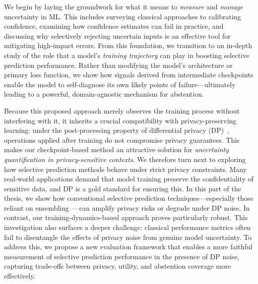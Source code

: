We begin by laying the groundwork for what it means to \emph{measure} and \emph{manage} uncertainty in ML. This includes surveying classical approaches to calibrating confidence, examining how confidence estimates can fail in practice, and discussing why selectively rejecting uncertain inputs is an effective tool for mitigating high-impact errors. From this foundation, we transition to an in-depth study of the role that a model’s \emph{training trajectory} can play in boosting selective prediction performance. Rather than modifying the model’s architecture or primary loss function, we show how signals derived from intermediate checkpoints enable the model to self-diagnose its own likely points of failure—ultimately leading to a powerful, domain-agnostic mechanism for abstention.

Because this proposed approach merely observes the training process without interfering with it, it inherits a crucial compatibility with privacy-preserving learning: under the post-processing property of differential privacy (DP)~\citep{dwork2006calibrating}, operations applied after training do not compromise privacy guarantees. This makes our checkpoint-based method an attractive solution for \emph{uncertainty quantification in privacy-sensitive contexts}. We therefore turn next to exploring how selective prediction methods behave under strict privacy constraints. Many real-world applications demand that model training preserve the confidentiality of sensitive data, and DP is a gold standard for ensuring this. In this part of the thesis, we show how conventional selective prediction techniques—especially those reliant on ensembling~\citep{lakshminarayanan2017simple}—can amplify privacy risks or degrade under DP noise. In contrast, our training-dynamics-based approach proves particularly robust. This investigation also surfaces a deeper challenge: classical performance metrics often fail to disentangle the effects of privacy noise from genuine model uncertainty. To address this, we propose a new evaluation framework that enables a more faithful measurement of selective prediction performance in the presence of DP noise, capturing trade-offs between privacy, utility, and abstention coverage more effectively.



